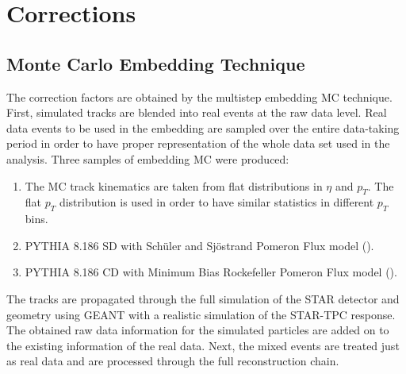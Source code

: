 \section{Corrections}\label{sec:Corrections}
\subsection{Monte Carlo Embedding Technique}
The correction factors are obtained by the multistep
embedding MC technique. First, simulated tracks are
blended into real events at the raw data level. Real data
events to be used in the embedding are sampled over the
entire data-taking period in order to have proper representation
of the whole data set used in the analysis.  Three samples of embedding MC were produced:
\begin{enumerate}
	\item The MC track kinematics are taken
	from flat distributions in $\eta$ and $p_T$. The flat $p_T$ distribution
	is used in order to have similar statistics in different
	$p_T$ bins.
	\item PYTHIA 8.186 SD  with Sch{\"u}ler and Sj{\"o}strand Pomeron Flux model (\cite{pythia8}).
	\item PYTHIA 8.186 CD  with Minimum Bias Rockefeller Pomeron Flux model (\cite{pythia8}).
\end{enumerate}
The tracks are propagated through the full simulation of
the STAR detector and geometry using GEANT with a
realistic simulation of the STAR-TPC response. The obtained raw data 
information for the simulated particles are added on to
the existing information of the real data. Next, the mixed events are treated just as real data
and are processed through the full reconstruction chain.

